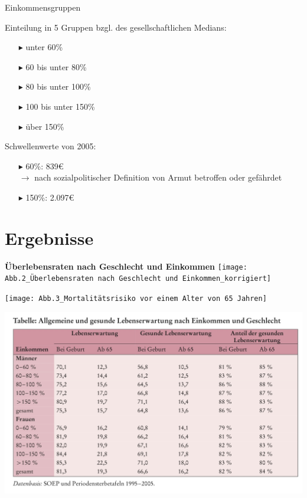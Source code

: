 \documentclass{beamer}
\begin{document}
\begin{frame}{Einkommensgruppen}
	\begin{block}{Einteilung in 5 Gruppen bzgl. des gesellschaftlichen Medians:}
		\begin{itemize}
			\item[$\blacktriangleright$] unter 60\%
			\item[$\blacktriangleright$] 60 bis unter 80\%
			\item[$\blacktriangleright$] 80 bis unter 100\%
			\item[$\blacktriangleright$] 100 bis unter 150\%
			\item[$\blacktriangleright$] über 150\%
		\end{itemize}
	\end{block}
	\begin{block}{Schwellenwerte von 2005:}
		\begin{itemize}
			\item[$\blacktriangleright$] 60\%: 839€ \\ $\rightarrow$ nach sozialpolitischer Definition von Armut betroffen oder gefährdet
			\item[$\blacktriangleright$] 150\%: 2.097€
		\end{itemize}
	\end{block}
\end{frame}



\section{Ergebnisse}
\begin{frame}
\textbf{Überlebensraten nach Geschlecht und Einkommen}
	\texttt{[image: Abb.2\_Überlebensraten nach Geschlecht und Einkommen\_korrigiert]}
\end{frame}

\begin{frame}
	\texttt{[image: Abb.3\_Mortalitätsrisiko vor einem Alter von 65 Jahren]}
\end{frame}

\begin{frame}
	\includegraphics[scale=0.18]{Tabelle_allgemeine und gesunde Lebenserwartung}
\end{frame}
\end{document}
